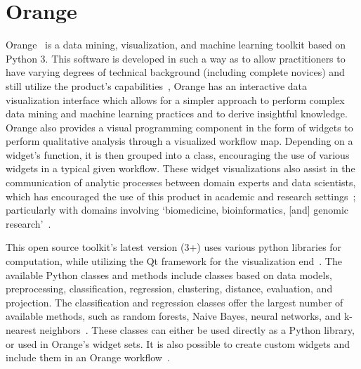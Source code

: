 \section{Orange}

Orange~\cite{hid-sp18-504-orange} is a  data mining, visualization,
and machine learning toolkit based on Python 3. This software is
developed in such a way as to allow practitioners to have varying
degrees of technical background (including complete novices) and
still utilize the product's capabilities~\cite{hid-sp18-504-orange},
Orange has an interactive data visualization interface which allows
for a simpler approach to perform complex data mining and machine
learning practices and to derive insightful knowledge. Orange also
provides a visual programming component in the form of widgets to
perform qualitative analysis through a visualized workflow map. Depending
on a widget's function, it is then grouped into a class, encouraging
the use of various widgets in a typical given workflow. These widget
visualizations also assist in the communication of analytic processes
between domain experts and data scientists, which has encouraged the
use of this product in academic and research settings~\cite{hid-sp18-504-orange};
particularly with domains involving `biomedicine, bioinformatics, [and]
genomic research'~\cite{hid-sp18-504-wiki-orange}.

This open source toolkit's latest version (3+) uses various python
libraries for computation, while utilizing the Qt framework for the
visualization end~\cite{hid-sp18-504-wiki-orange}. The available Python
classes and methods include classes based on data models, preprocessing,
classification, regression, clustering, distance, evaluation, and projection.
The classification and regression classes offer the largest number of
available methods, such as random forests, Naive Bayes, neural networks,
and k-nearest neighbors~\cite{hid-sp18-504-orange}. These classes can
either be used directly as a Python library, or used in Orange's widget
sets. It is also possible to create custom widgets and include them in an
Orange workflow~\cite{hid-sp18-504-wiki-orange}.
